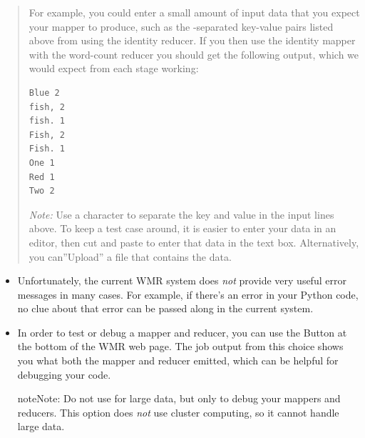 \documentclass[letterpaper,10pt,openany,oneside]{sphinxmanual}
\begin{document}
\begin{quote}

For example, you could enter a small amount of input data that you
expect your mapper to produce, such as the -separated
key-value pairs listed above from using the identity reducer. If
you then use the identity mapper  with the
word-count reducer  you should get the following
output, which we would expect from each stage working:

\begin{Verbatim}[commandchars=\\\{\}]
Blue 2
fish, 2
fish. 1
Fish, 2
Fish. 1
One 1
Red 1
Two 2
\end{Verbatim}

\emph{Note:} Use a  character to separate the key and value in
the input lines above. To keep a test case around, it is easier to
enter your data in an editor, then cut and paste to enter that data
in the text box. Alternatively, you can''Upload'' a file that
contains the data.
\end{quote}
\begin{itemize}
\item {} 
Unfortunately, the current WMR system does \emph{not} provide very
useful error messages in many cases. For example, if there's an
error in your Python code, no clue about that error can be passed
along in the current system.

\item {} 
In order to test or debug a mapper and reducer, you can use the
 Button at the bottom of the WMR web page. The job output
from this choice shows you what both the mapper and reducer
emitted, which can be helpful for debugging your code.

\begin{notice}{note}{Note:}
Do not use  for large data, but only to debug
your mappers and reducers. This option does \emph{not} use cluster
computing, so it cannot handle large data.
\end{notice}

\end{itemize}
\end{document}
